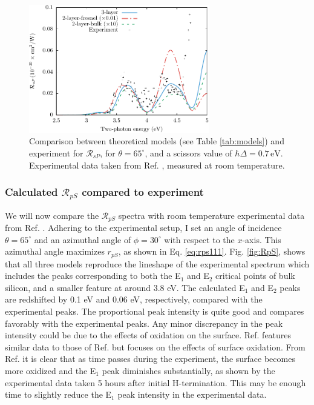 \begin{figure}[H]
\centering
\includegraphics[width=0.7\textwidth]{content/figures/fig-Si1x1-Mejia_RsP}
\caption{Comparison between theoretical models (see Table \ref{tab:models}) and
experiment for $\mathcal{R}_{sP}$, for $\theta=65^{\circ}$, and a scissors value
of $\hbar\Delta = 0.7\,\text{eV}$. Experimental data taken from Ref. \cite{mejiaPRB02},
measured at room temperature.}
\label{fig:RsP}
\end{figure}



\subsubsection{Calculated \texorpdfstring{$\mathcal{R}_{pS}$}{RpS} compared to 
experiment}\label{sec:1x1RpS}

We will now compare the $\mathcal{R}_{pS}$ spectra with room temperature
experimental data from Ref. \cite{mejiaPRB02}. Adhering to the experimental
setup, I set an angle of incidence $\theta=65^{\circ}$ and an azimuthal angle of
$\phi=30^\circ$ with respect to the $x$-axis. This azimuthal angle maximizes
$r_{pS}$, as shown in Eq. \eqref{eq:rps111}. Fig. \ref{fig:RpS}, shows that all
three models reproduce the lineshape of the experimental spectrum which includes
the peaks corresponding to both the E$_{1}$ and E$_{2}$ critical points of bulk
silicon, and a smaller feature at around 3.8 eV. The calculated E$_{1}$ and
E$_{2}$ peaks are redshifted by 0.1 eV and 0.06 eV, respectively, compared with
the experimental peaks. The proportional peak intensity is quite good and
compares favorably with the experimental peaks. Any minor discrepancy in the
peak intensity could be due to the effects of oxidation on the surface. Ref.
\cite{bergfeldPRL04} features similar data to those of Ref. \cite{mejiaPRB02}
but focuses on the effects of surface oxidation. From Ref. \cite{bergfeldPRL04}
it is clear that as time passes during the experiment, the surface becomes more
oxidized and the E$_{1}$ peak diminishes substantially, as shown by the
experimental data taken 5 hours after initial H-termination. This may be enough
time to slightly reduce the E$_{1}$ peak intensity in the experimental data.

